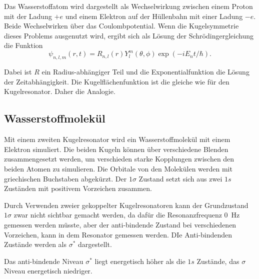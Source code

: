 Das Wasserstoffatom wird dargestellt als Wechselwirkung zwischen einem Proton mit der Ladung $+e$ und einem Elektron auf der Hüllenbahn mit einer Ladung $-e$. Beide Wechselwirken über das Coulombpotential. Wenn die Kugelsymmetrie dieses Problems ausgenutzt wird, ergibt sich als Lösung der Schrödingergleichung die Funktion 
\begin{equation*}
    \psi_{n,l,m} (r,t) = R_{n,l}(r) Y_{l}^m(\theta, \phi) \exp(-i E_n t/\hbar).
\end{equation*}

Dabei ist $R$ ein Radius-abhängiger Teil und die Exponentialfunktion die Lösung der Zeitabhängigkeit. 
Die Kugelflächenfunktion ist die gleiche wie für den Kugelresonator. Daher die Analogie.

\subsection{Wasserstoffmolekül}
\label{sec:Wasserstoffmolekül}

Mit einem zweiten Kugelresonator wird ein Wasserstoffmolekül mit einem Elektron simuliert. 
Die beiden Kugeln können über verschiedene Blenden zusammengesetzt werden, um verschieden starke Kopplungen zwischen den beiden Atomen zu simulieren. 
Die Orbitale von den Molekülen werden mit griechischen Buchstaben abgekürzt. Der $1\sigma$ Zustand setzt sich aus zwei $1s$ Zuständen mit positivem Vorzeichen zusammen. 

Durch Verwenden zweier gekoppelter Kugelresonatoren kann der Grundzustand $1\sigma$ zwar nicht sichtbar gemacht werden, da dafür die Resonanzfrequenz \SI{0}{\hertz} gemessen werden müsste, aber der anti-bindende Zustand bei verschiedenen Vorzeichen, kann in dem Resonator gemessen werden. DIe Anti-bindenden Zustände werden als $\sigma^*$ dargestellt. 

Das anti-bindende Niveau $\sigma^*$ liegt energetisch höher als die $1s$ Zustände, das $\sigma$ Niveau energetisch niedriger. 








